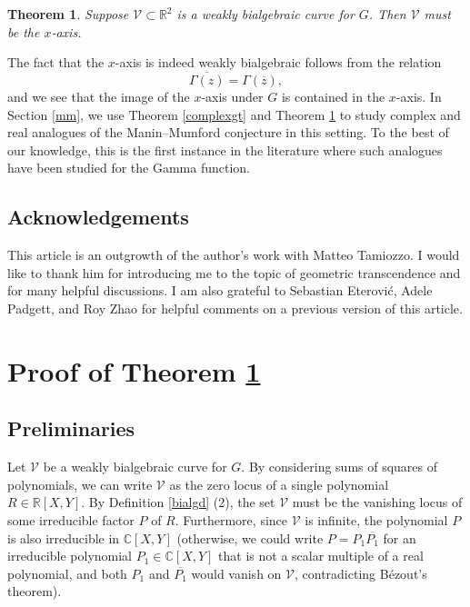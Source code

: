 \documentclass[11pt,reqno]{amsart}
\newtheorem{theorem}{Theorem}[section]
\theoremstyle{definition}
\numberwithin{equation}{section}
\renewcommand{\bar}{\overline}
\newcommand{\cV}{\mathcal{V}}
\begin{document}
\begin{theorem}\label{mainthm}
Suppose $\mathcal V \subset \mathbb R^2$ is a weakly bialgebraic curve for $G$. Then $\mathcal V$ must be the $x$-axis. 
\end{theorem}

The fact that the $x$-axis is indeed weakly bialgebraic follows from the relation
\begin{equation} \label{conj}
\bar{\Gamma(z)}= \Gamma(\bar{z}),  
\end{equation}
and we see that the image of the $x$-axis under $G$ is contained in the $x$-axis.  In Section \ref{mm}, we use Theorem \ref{complexgt} and Theorem \ref{mainthm} to study complex and real analogues of the Manin--Mumford conjecture in this setting.  To the best of our knowledge, this is the first instance in the literature where such analogues have been studied for the Gamma function. 

\subsection*{Acknowledgements} This article is an outgrowth of the author's work \cite{ST25}  with Matteo Tamiozzo. I would like to thank him for introducing me to the topic of geometric transcendence and for many helpful discussions.  I am also grateful to Sebastian Eterovi\'c, Adele Padgett, and Roy Zhao for helpful comments on a previous version of this article. 





\section{Proof of Theorem \ref{mainthm}}




\subsection{Preliminaries}

Let $\mathcal V$ be a weakly bialgebraic curve for $G$. By considering sums of squares of polynomials, we can write $\mathcal V$ as the zero locus of a single polynomial $R \in \mathbb R[X, Y]$.  By Definition \ref{bialgd} (2), the set $\mathcal V$ must be the vanishing locus of some irreducible factor $P$ of $R$. 
Furthermore, since $\cV$ is infinite, the polynomial $P$ is also irreducible in $\mathbb C[X, Y]$ (otherwise, we could write $P=P_1 \bar{P_1}$ for an irreducible polynomial $P_1 \in \mathbb C[X, Y]$ that is not a scalar multiple of a real polynomial, and both $P_1$ and $\bar{P_1}$ would vanish on $\cV$, contradicting Bézout's theorem).
\end{document}
